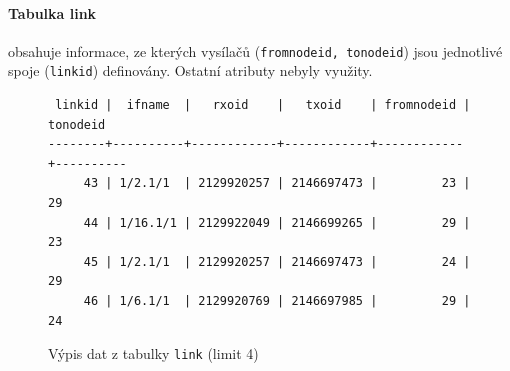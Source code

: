 \documentclass[a4paper,12pt,oneside]{report}
\begin{document}
 

\paragraph*{Tabulka link} obsahuje informace, ze kterých vysílačů
(\texttt{fromnodeid, tonodeid}) jsou jednotlivé spoje
(\texttt{linkid}) definovány. Ostatní atributy nebyly využity.

\begin{figure}[h!]
\centering
\footnotesize
\begin{BVerbatim}
 linkid |  ifname  |   rxoid    |   txoid    | fromnodeid | tonodeid 
--------+----------+------------+------------+------------+----------
     43 | 1/2.1/1  | 2129920257 | 2146697473 |         23 |       29
     44 | 1/16.1/1 | 2129922049 | 2146699265 |         29 |       23
     45 | 1/2.1/1  | 2129920257 | 2146697473 |         24 |       29
     46 | 1/6.1/1  | 2129920769 | 2146697985 |         29 |       24
\end{BVerbatim}
\caption{ Výpis dat z tabulky  \texttt{link} (limit 4) }
\end{figure}
\end{document}
